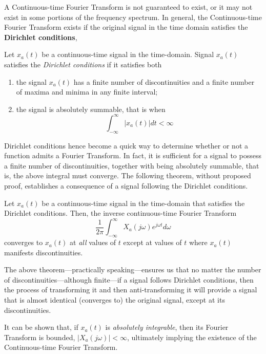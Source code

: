 \documentclass[\documentfontsize, twocolumn]{\classname}
\begin{document}
A Continuous-time Fourier Transform is not guaranteed to exist, or it may not
exist in some portions of the frequency spectrum.
In general, the Continuous-time Fourier Transform exists if the original signal in the time domain satisfies the \textbf{Dirichlet conditions},
\begin{rules}
    Let $x_a(t)$ be a continuous-time signal in the time-domain. Signal $x_a(t)$ satisfies the \emph{Dirichlet conditions} if it satisfies both
    \begin{enumerate}
        \item the signal $x_a(t)$ has a finite number of discontinuities and a finite number of maxima and minima in any finite interval;
        \item the signal is absolutely summable, that is when
            \[
                \int_{-\infty}^\infty |x_a(t)|dt < \infty
            \]
    \end{enumerate}
\end{rules}

Dirichlet conditions hence become a quick way to determine whether or not a function
admits a Fourier Transform. In fact, it is sufficient for a signal to possess a
finite number of discontinuities, together with being absolutely summable, that
is, the above integral must converge.
The following theorem, without proposed proof, establishes a consequence of a
signal following the Dirichlet conditions.

\begin{thm}
    Let $x_a(t)$ be a continuous-time signal in the time-domain that satisfies
    	the Dirichlet conditions. Then, the inverse continuous-time Fourier
    	Transform
    \[
        \frac 1 {2\pi}\int_{-\infty}^\infty X_a(j\omega) e^{j\omega t}d\omega
    \]
    converges to $x_a(t)$ at \emph{all} values of $t$ except at values of $t$ where $x_a(t)$ manifests discontinuities.
\end{thm}

The above theorem---practically speaking---ensures us that no matter the number
of discontinuities---although finite---if a signal follows Dirichlet conditions, then the
process of transforming it and then anti-transforming it will provide a signal
that is almost identical (converges to) the original signal, except at its
discontinuities.

It can be shown that, if $x_a(t)$ is \emph{absolutely integrable}, then its Fourier Transform is bounded, $\left|X_a(j\omega)\right|<\infty$, ultimately implying the existence of the Continuous-time Fourier Transform.
\end{document}
